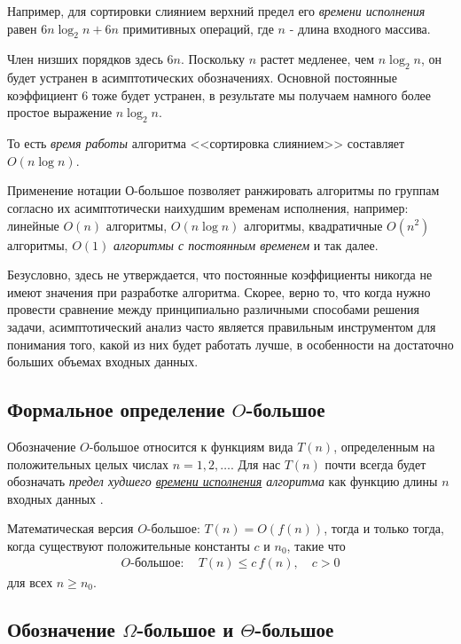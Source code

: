 \documentclass[%
	11pt,
	a4paper,
	utf8,
		]{article}
\begin{document}
Например, для сортировки слиянием верхний предел его \emph{времени исполнения} равен $ 6 n \log_2 n + 6 n $ примитивных операций, где $ n $ - длина входного массива.

Член низших порядков здесь $ 6 n $. Поскольку $ n $ растет медленее, чем $ n \log_2 n $, он будет устранен в асимптотических обозначениях. Основной постоянные коэффициент 6 тоже будет устранен, в результате мы получаем намного более простое выражение $ n \log_2 n $. 

То есть \emph{время работы} алгоритма <<сортировка слиянием>> составляет $ O(n \log n) $.

Применение нотации $ О $-большое позволяет ранжировать алгоритмы по группам согласно их асимптотически наихудшим временам исполнения, например: линейные $ O(n) $ алгоритмы, $ O(n \log n) $ алгоритмы, квадратичные $ O(n^2) $ алгоритмы, $ O(1) $ \emph{алгоритмы с постоянным временем} и так далее.

Безусловно, здесь не утверждается, что постоянные коэффициенты никогда не имеют значения при разработке алгоритма. Скорее, верно то, что когда нужно провести сравнение между принципиально различными способами решения задачи, асимптотический анализ часто является правильным инструментом для понимания того, какой из них будет работать лучше, в особенности на достаточно больших объемах входных данных.

\subsection{Формальное определение $ O $-большое}

Обозначение $ O $-большое относится к функциям вида $ T(n) $, определенным на положительных целых числах $ n = 1, 2, \dots $. Для нас $ T(n) $ почти всегда будет обозначать \emph{предел худшего \underline{времени исполнения} алгоритма} как функцию длины $ n $ входных данных \cite[74]{roughgarden:2019}.

Математическая версия $ O $-большое: $ T(n) = O(f(n)) $, тогда и только тогда, когда существуют положительные константы $ c $ и $ n_0 $, такие что
\begin{align*}
	O\textit{-большое}:\quad T(n) \leqslant c\,f(n), \quad c > 0
\end{align*}
для всех $ n \geqslant n_0 $.

\subsection{Обозначение $ \Omega $-большое и $ \Theta $-большое}
\end{document}
